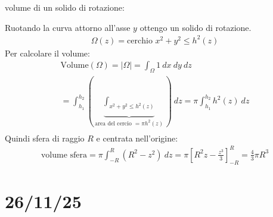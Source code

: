 \documentclass[a4paper, oneside]{article}
\begin{document}
\begin{example}
  volume di un solido di rotazione:
  \begin{center}
  \end{center}
  Ruotando la curva attorno all'asse $y$ ottengo un solido di rotazione.\\
  \begin{gather*}
    \Omega (z) = \text{cerchio } x^2+y^2 \leq h^2(z)
  \end{gather*}
  Per calcolare il volume:
  \begin{gather*}
    \text{Volume}(\Omega) = \left\lvert \Omega \right\rvert = \int_\Omega 1 \ dx \ dy \ dz \\
    = \int_{h_1}^{h_2} \left( \underbrace{\int_{x^2+y^2 \leq h^2(z)}}_{\text{area del cercio }=\pi h^2(z)} \right) \ dz = \pi \int_{h_1}^{h_2} h^2(z) \ dz  \\
  \end{gather*}
  Quindi sfera di raggio $R$ e centrata nell'origine:
  \begin{gather*}
    \text{volume sfera} = \pi \int_{-R}^{R} (R^2 - z^2) \ dz = \pi\left[ R^2 z - \frac{z^3}{3} \right]_{-R}^{R}  = \frac{4}{3} \pi R^3
  \end{gather*}
\end{example} 




\section{26/11/25}
\end{document}
